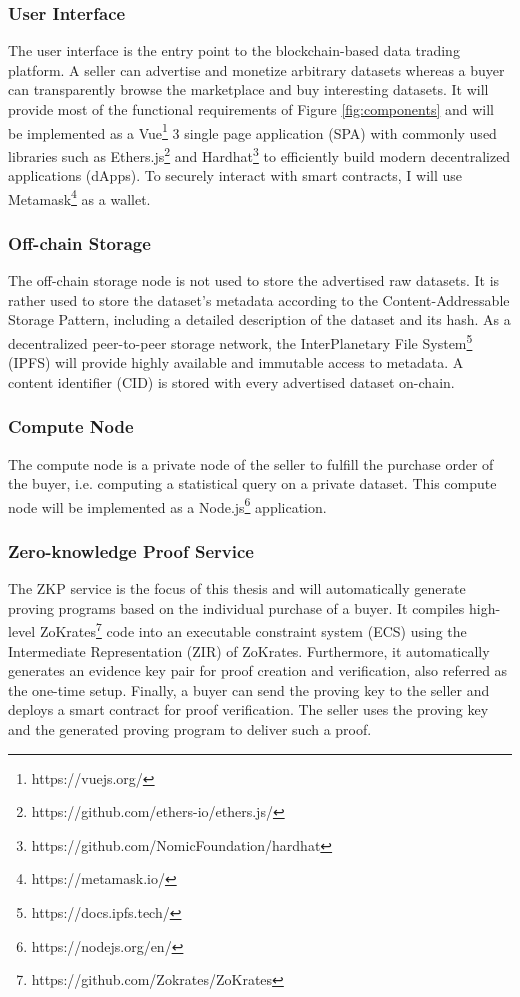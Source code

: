 \subsubsection{User Interface}
The user interface is the entry point to the blockchain-based data trading platform. A seller can advertise and monetize arbitrary datasets whereas a buyer can transparently browse the marketplace and buy interesting datasets. It will provide most of the functional requirements of Figure \ref{fig:components} and will be implemented as a Vue\footnote{https://vuejs.org/} 3 single page application (SPA) with commonly used libraries such as Ethers.js\footnote{https://github.com/ethers-io/ethers.js/} and Hardhat\footnote{https://github.com/NomicFoundation/hardhat} to efficiently build modern decentralized applications (dApps). To securely interact with smart contracts, I will use Metamask\footnote{https://metamask.io/} as a wallet.

\subsubsection{Off-chain Storage}
The off-chain storage node is not used to store the advertised raw datasets. It is rather used to store the dataset's metadata according to the Content-Addressable Storage Pattern\cite{eberhardtBlockchainInsightsOffChaining2017}, including a detailed description of the dataset and its hash. As a decentralized peer-to-peer storage network, the InterPlanetary File System\footnote{https://docs.ipfs.tech/} (IPFS) will provide highly available and immutable access to metadata. A content identifier (CID) is stored with every advertised dataset on-chain.

\subsubsection{Compute Node}
The compute node is a private node of the seller to fulfill the purchase order of the buyer, i.e. computing a statistical query on a private dataset. This compute node will be implemented as a Node.js\footnote{https://nodejs.org/en/} application.

\subsubsection{Zero-knowledge Proof Service}
The ZKP service is the focus of this thesis and will automatically generate proving programs based on the individual purchase of a buyer. It compiles high-level ZoKrates\footnote{https://github.com/Zokrates/ZoKrates} code into an executable constraint system (ECS) using the Intermediate Representation (ZIR) of ZoKrates. Furthermore, it automatically generates an evidence key pair for proof creation and verification, also referred as the one-time setup. Finally, a buyer can send the proving key to the seller and deploys a smart contract for proof verification. The seller uses the proving key and the generated proving program to deliver such a proof.